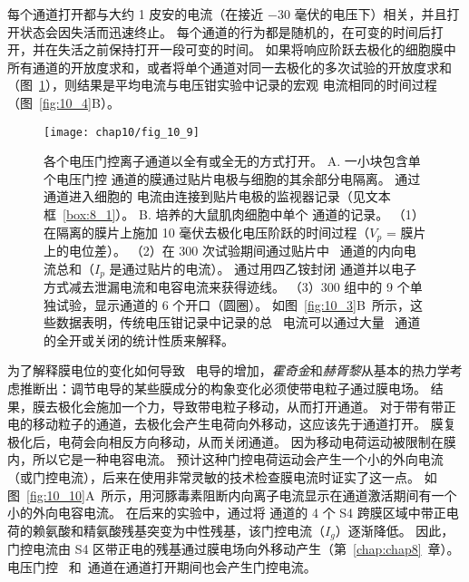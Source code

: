 每个通道打开都与大约 1 皮安的电流（在接近 −30 毫伏的电压下）相关，并且打开状态会因失活而迅速终止。 
每个通道的行为都是随机的，在可变的时间后打开，并在失活之前保持打开一段可变的时间。
如果将响应阶跃去极化的细胞膜中所有通道的开放度求和，或者将单个通道对同一去极化的多次试验的开放度求和（图~\ref{fig:10_9}），则结果是平均电流与电压钳实验中记录的宏观  电流相同的时间过程（图~\ref{fig:10_4}B）。


\begin{figure}[htbp]
	\centering
	\texttt{[image: chap10/fig\_10\_9]}
	\caption{各个电压门控离子通道以全有或全无的方式打开。
		A. 一小块包含单个电压门控  通道的膜通过贴片电极与细胞的其余部分电隔离。
		通过通道进入细胞的  电流由连接到贴片电极的监视器记录（见文本框~\ref{box:8_1}）。
		B. 培养的大鼠肌肉细胞中单个  通道的记录。
		（1）在隔离的膜片上施加 10 毫伏去极化电压阶跃的时间过程（$V_p$ = 膜片上的电位差）。
		（2）在 300 次试验期间通过贴片中~ 通道的内向电流总和（$I_p$ 是通过贴片的电流）。
		通过用四乙铵封闭  通道并以电子方式减去泄漏电流和电容电流来获得迹线。
		（3）300 组中的 9 个单独试验，显示通道的 6 个开口（圆圈）。
		如图~\ref{fig:10_3}B~所示，这些数据表明，传统电压钳记录中记录的总~ 电流可以通过大量~ 通道的全开或关闭的统计性质来解释\cite{sigworth1980single}。}
	\label{fig:10_9}
\end{figure}


为了解释膜电位的变化如何导致~ 电导的增加，\textit{霍奇金}和\textit{赫胥黎}从基本的热力学考虑推断出：调节电导的某些膜成分的构象变化必须使带电粒子通过膜电场。
结果，膜去极化会施加一个力，导致带电粒子移动，从而打开通道。
对于带有带正电的移动粒子的通道，去极化会产生电荷向外移动，这应该先于通道打开。
膜复极化后，电荷会向相反方向移动，从而关闭通道。 
因为移动电荷运动被限制在膜内，所以它是一种电容电流。
预计这种门控电荷运动会产生一个小的外向电流（或门控电流），后来在使用非常灵敏的技术检查膜电流时证实了这一点。
如图~\ref{fig:10_10}A~所示，用河豚毒素阻断内向离子电流显示在通道激活期间有一个小的外向电容电流。 
在后来的实验中，通过将  通道的 4 个 S4 跨膜区域中带正电荷的赖氨酸和精氨酸残基突变为中性残基，该门控电流（$I_g$）逐渐降低。
因此，门控电流由 S4 区带正电的残基通过膜电场向外移动产生（第~\ref{chap:chap8}~章）。
电压门控~ 和~通道在通道打开期间也会产生门控电流。


